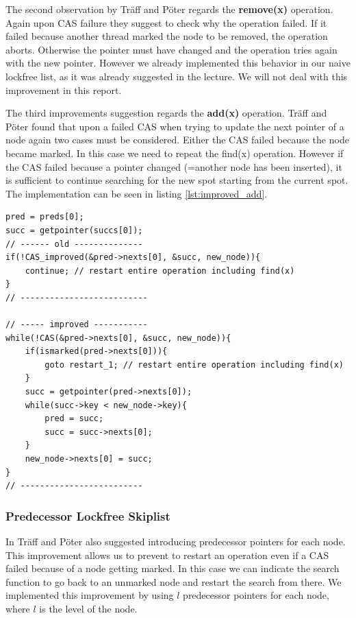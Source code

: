 \documentclass{article}
\begin{document}
\noindent The second observation by Träff and Pöter regards the \textbf{remove(x)} operation. Again upon CAS failure they suggest to check why the operation failed. If it failed because another thread marked the node to be removed, the operation aborts. Otherwise the pointer must have changed and the operation tries again with the new pointer. However we already implemented this behavior in our naive lockfree list, as it was already suggested in the lecture. We will not deal with this improvement in this report. \medskip

\noindent The third improvements suggestion regards the \textbf{add(x)} operation. Träff and Pöter found that upon a failed CAS when trying to update the next pointer of a node again two cases must be considered. Either the CAS failed because the node became marked. In this case we need to repeat the find(x) operation. However if the CAS failed because a pointer changed (=another node has been inserted), it is sufficient to continue searching for the new spot starting from the current spot. The implementation can be seen in listing \ref{lst:improved_add}.

\begin{lstlisting}[float,floatplacement=H,style=CStyle, caption=Improved add(x) operation, label=lst:improved_add]
pred = preds[0];
succ = getpointer(succs[0]);
// ------ old --------------
if(!CAS_improved(&pred->nexts[0], &succ, new_node)){
    continue; // restart entire operation including find(x)
}
// --------------------------

// ----- improved -----------
while(!CAS(&pred->nexts[0], &succ, new_node)){
    if(ismarked(pred->nexts[0])){
        goto restart_1; // restart entire operation including find(x)
    }
    succ = getpointer(pred->nexts[0]);
    while(succ->key < new_node->key){
        pred = succ;
        succ = succ->nexts[0];
    }
    new_node->nexts[0] = succ;
}
// -------------------------
\end{lstlisting}

\subsubsection{Predecessor Lockfree Skiplist}
In \cite{improvements} Träff and Pöter also suggested introducing predecessor pointers for each node. This improvement allows us to prevent to restart an operation even if a CAS failed because of a node getting marked. In this case we can indicate the search function to go back to an unmarked node and restart the search from there. We implemented this improvement by using $l$ predecessor pointers for each node, where $l$ is the level of the node. \medskip
\end{document}
